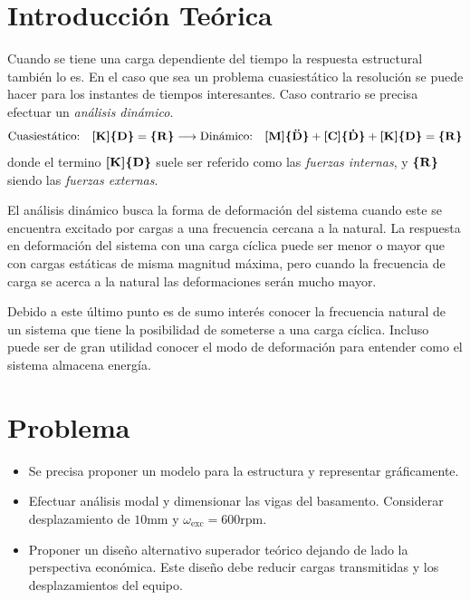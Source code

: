 \documentclass[onecolumn,10pt,titlepage,a4paper]{article}
\begin{document}
\tableofcontents

\section{Introducción Teórica}
Cuando se tiene una carga dependiente del tiempo la respuesta estructural también lo es. En el caso que sea un problema cuasiestático la resolución se puede hacer para los instantes de tiempos interesantes. Caso contrario se precisa efectuar un \textit{análisis dinámico}.
\[
\text{Cuasiestático:}\quad \boldsymbol{[}\mathbf{K} \boldsymbol{]}\boldsymbol{\{ }\mathbf{D} \boldsymbol{\}} = \boldsymbol{\{ }\mathbf{R} \boldsymbol{\}} \longrightarrow \text{Dinámico:} \quad 
\boldsymbol{[}\mathbf{M} \boldsymbol{]} \boldsymbol{\{ }\mathbf{\ddot{D}} \boldsymbol{\}} + \boldsymbol{[}\mathbf{C} \boldsymbol{]}\boldsymbol{\{ }\mathbf{\dot{D}} \boldsymbol{\}} + \boldsymbol{[}\mathbf{K} \boldsymbol{]}\boldsymbol{\{ }\mathbf{D} \boldsymbol{\}} = \boldsymbol{\{ }\mathbf{R} \boldsymbol{\}}	
\]
donde el termino $\boldsymbol{[}\mathbf{K} \boldsymbol{]}\boldsymbol{\{ }\mathbf{D} \boldsymbol{\}}$ suele ser referido como las \textit{fuerzas internas}, y $\boldsymbol{\{ }\mathbf{R} \boldsymbol{\}}$ siendo las \textit{fuerzas externas}.

El análisis dinámico busca la forma de deformación del sistema cuando este se encuentra excitado por cargas a una frecuencia cercana a la natural. La respuesta en deformación del sistema con una carga cíclica puede ser menor o mayor que con cargas estáticas de misma magnitud máxima, pero cuando la frecuencia de carga se acerca a la natural las deformaciones serán mucho mayor. 

Debido a este último punto es de sumo interés conocer la frecuencia natural de un sistema que tiene la posibilidad de someterse a una carga cíclica. Incluso puede ser de gran utilidad conocer el modo de deformación para entender como el sistema almacena energía.


\setcounter{section}{0}
\section{Problema}

\begin{itemize}
	\item Se precisa proponer un modelo para la estructura y representar gráficamente.
	\item Efectuar análisis modal y dimensionar las vigas del basamento. Considerar desplazamiento de $10$mm y $\omega_{\mathrm{exc}}=600\mathrm{rpm}$.
	\item Proponer un diseño alternativo superador teórico dejando de lado la perspectiva económica. Este diseño debe reducir cargas transmitidas y los desplazamientos del equipo.
\end{itemize}
\end{document}

